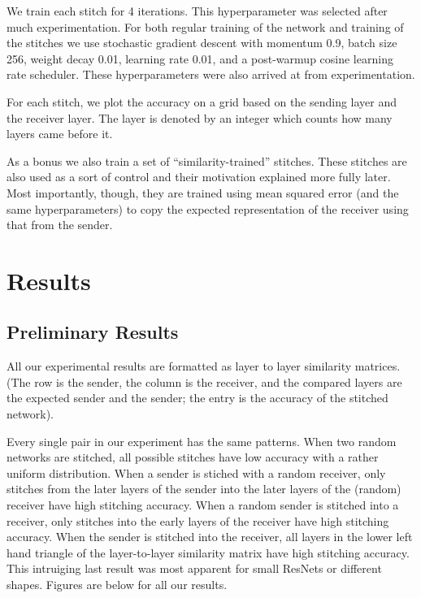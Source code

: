 \documentclass{article} %
\begin{document}
We train each stitch for 4 iterations. This hyperparameter was selected after much experimentation. For both
regular training of the network and training of the stitches we use stochastic gradient descent with momentum 0.9,
batch size 256, weight decay 0.01, learning rate 0.01, and a post-warmup cosine learning rate scheduler.
 These hyperparameters were also arrived at from experimentation.

For each stitch, we plot the accuracy on a grid based on the sending layer and the receiver layer. The layer is
denoted by an integer which counts how many layers came before it.

As a bonus we also train a set of ``similarity-trained'' stitches. These stitches are also used as a sort of control and
their motivation explained more fully later. Most importantly, though, they are trained using mean squared error (and the
same hyperparameters) to copy the expected representation of the receiver using that from the sender.

\section{Results}
\label{Results}
\subsection*{Preliminary Results}
All our experimental results are formatted as layer to
layer similarity matrices. (The row is the sender, the column is the receiver, and the compared layers are the expected sender
and the sender; the entry is the accuracy of the stitched network).

Every single pair in our experiment has the same
patterns. When two random networks are stitched, all possible stitches have low accuracy with a rather uniform distribution. When
a sender is stiched with a random receiver, only stitches from the later layers of the sender into the later layers of the (random)
receiver have high stitching accuracy. When a random sender is stitched into a receiver, only stitches into the early layers of the
receiver have high stitching accuracy. When the sender is stitched into the receiver, all layers in the lower left hand triangle
of the layer-to-layer similarity matrix have high stitching accuracy. 
This intruiging last result was most apparent for small ResNets or different shapes.
Figures are below for all our results.
\end{document}
